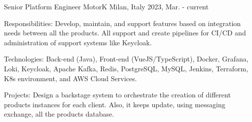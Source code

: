 

\begin{cventries}
  \cventry
    {Senior Platform Engineer} %
    {MotorK} %
    {Milan, Italy} %
    {2023, Mar. - current} %
    {
      \begin{cvitems} %
        \item {Responsibilities: Develop, maintain, and support features based on integration needs between all the products. All support and create pipelines for CI/CD and administration of support systems like Keycloak.}
        \item {Technologies: Back-end (Java), Front-end (VueJS/TypeScript), Docker, Grafana, Loki, Keycloak, Apache Kafka, Redis, PostgreSQL, MySQL, Jenkins, Terraform, K8s environment, and AWS Cloud Services.}
        \item {Projects: Design a backstage system to orchestrate the creation of different products instances for each client. Also, it keeps update, using messaging exchange, all the products database.}
      \end{cvitems}
    }


\end{cventries}
